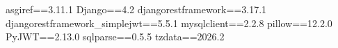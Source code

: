 asgiref==3.11.1
Django==4.2
djangorestframework==3.17.1
djangorestframework_simplejwt==5.5.1
mysqlclient==2.2.8
pillow==12.2.0
PyJWT==2.13.0
sqlparse==0.5.5
tzdata==2026.2

